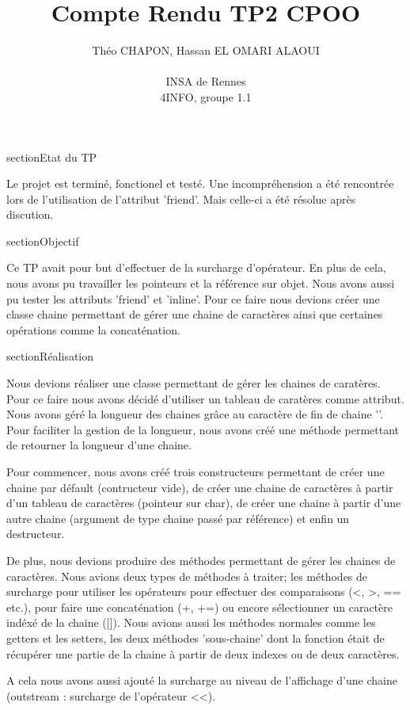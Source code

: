 \documentclass[a4paper,12pt]{article}
\author{
  Théo \textsc{CHAPON}, Hassan \textsc{EL OMARI ALAOUI} \\ \\
  INSA de Rennes \\
  4INFO, groupe 1.1
}
\title{Compte Rendu TP2 CPOO}
\begin{document}

section{Etat du TP}

Le projet est terminé, fonctionel et testé. Une incompréhension a été rencontrée lors de l'utilisation de l'attribut 'friend'.
Mais celle-ci a été résolue après discution.


section{Objectif}

Ce TP avait pour but d'effectuer de la surcharge d'opérateur. En plus de cela, nous avons pu travailler les pointeurs et la
référence sur objet. Nous avons aussi pu tester les attributs 'friend' et 'inline'. Pour ce faire nous devions créer une 
classe chaine permettant de gérer une chaine de caractères ainsi que certaines opérations comme la concaténation.


section{Réalisation}

Nous devions réaliser une classe permettant de gérer les chaines de caratères. Pour ce faire nous avons décidé d'utiliser 
un tableau de caratères comme attribut. Nous avons géré la longueur des chaines grâce au caractère de fin de chaine '\0'.
Pour faciliter la gestion de la longueur, nous avons créé une méthode permettant de retourner la longueur d'une chaine.

Pour commencer, nous avons créé trois constructeurs permettant de créer une chaine par défault (contructeur vide), de
créer une chaine de caractères à partir d'un tableau de caractères (pointeur sur char), de créer une chaine à partir d'une 
autre chaine (argument de type chaine passé par référence) et enfin un destructeur. 

De plus, nous devions produire des méthodes permettant de gérer les chaines de caractères. Nous avions deux types de méthodes
à traiter; les méthodes de surcharge pour utiliser les opérateurs pour effectuer des comparaisons (<, >, == etc.),
pour faire une concaténation (+, +=) ou encore sélectionner un caractère indéxé de la chaine ([]). Nous avions aussi les 
méthodes normales comme les getters et les setters, les deux méthodes 'sous-chaine' dont la fonction était de récupérer une
partie de la chaine à partir de deux indexes ou de deux caractères.

A cela nous avons aussi ajouté la surcharge au niveau de l'affichage d'une chaine (outstream : surcharge de l'opérateur <<).




\end{document}
